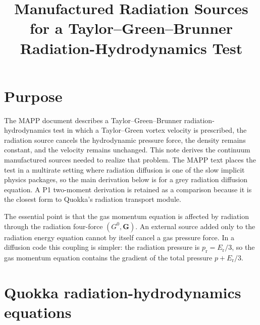 \documentclass[11pt]{article}
\title{Manufactured Radiation Sources for a Taylor--Green--Brunner Radiation-Hydrodynamics Test}
\author{}
\date{}
\newcommand{\Er}{E_{\mathrm r}}
\newcommand{\Gmom}{\bm{G}}
\newcommand{\Gzero}{G^0}
\begin{document}
\maketitle

\section{Purpose}

The MAPP document describes a Taylor--Green--Brunner radiation-hydrodynamics
test in which a Taylor--Green vortex velocity is prescribed, the radiation
source cancels the hydrodynamic pressure force, the density remains constant,
and the velocity remains unchanged.  This note derives the continuum
manufactured sources needed to realize that problem.  The MAPP text places the
test in a multirate setting where radiation diffusion is one of the slow
implicit physics packages, so the main derivation below is for a grey
radiation diffusion equation.  A P1 two-moment derivation is retained as a
comparison because it is the closest form to Quokka's radiation transport
module.

The essential point is that the gas momentum equation is affected by radiation
through the radiation four-force \((\Gzero,\Gmom)\).  An external source added
only to the radiation energy equation cannot by itself cancel a gas pressure
force.  In a diffusion code this coupling is simpler: the radiation pressure
is \(p_{\mathrm r}=\Er/3\), so the gas momentum equation contains the gradient
of the total pressure \(p+\Er/3\).

\section{Quokka radiation-hydrodynamics equations}
\end{document}
